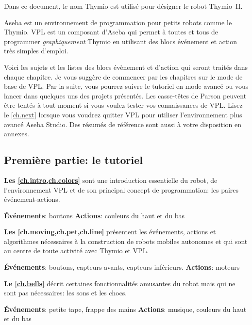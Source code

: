 Dans ce document, le nom Thymio est utilisé pour désigner le robot Thymio~II.

Aseba est un environnement de programmation pour petits robots comme le Thymio.
VPL est un composant d'Aseba qui permet à toutes et tous de programmer \textit{graphiquement} Thymio en utilisant des blocs événement et action très simples d'emploi.

Voici les sujets et les listes des blocs évènement et d'action qui seront traités dans chaque chapitre.
Je vous suggère de commencer par les chapitres sur le mode de base de VPL.
Par la suite, vous pourrez suivre le tutoriel en mode avancé ou vous lancer dans quelques uns des projets présentés.
Les casse-têtes de Parson peuvent être tentés à tout moment si vous voulez tester vos connaissances de VPL.
Lisez le \cref{ch.next} lorsque vous voudrez quitter VPL pour utiliser l'environnement plus avancé Aseba Studio.
Des résumés de référence sont aussi à votre disposition en annexes.

\subsection*{Première partie: le tutoriel}
\textbf{Les \cref{ch.intro,ch.colors}} sont une introduction essentielle du robot, de l'environnement VPL et de son principal concept de programmation: les paires événement-actions.

\textbf{Événements}: boutons\hfill
\textbf{Actions}: couleurs du haut et du bas

\hfill{}\quad{}

\medskip

\textbf{Les \cref{ch.moving,ch.pet,ch.line}} présentent les événements, actions et algorithmes nécessaires à la construction de robots mobiles autonomes et qui sont au centre de toute activité avec Thymio et VPL.

\textbf{Événements}: boutons, capteurs avants, capteurs inférieurs.\hfill
\textbf{Actions}: moteurs

 \quad{} \quad {}\hfill
{}

\medskip

\textbf{Le \cref{ch.bells}} décrit certaines fonctionnalités amusantes du robot mais qui ne sont pas nécessaires: les sons et les chocs.

\textbf{Événements}: petite tape, frappe des mains\hfill
\textbf{Actions}: musique, couleurs du haut et du bas

